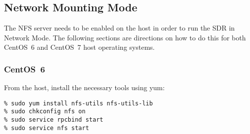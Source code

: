 \iffalse
This file is protected by Copyright. Please refer to the COPYRIGHT file
distributed with this source distribution.

This file is part of OpenCPI <http://www.opencpi.org>

OpenCPI is free software: you can redistribute it and/or modify it under the
terms of the GNU Lesser General Public License as published by the Free Software
Foundation, either version 3 of the License, or (at your option) any later
version.

OpenCPI is distributed in the hope that it will be useful, but WITHOUT ANY
WARRANTY; without even the implied warranty of MERCHANTABILITY or FITNESS FOR A
PARTICULAR PURPOSE. See the GNU Lesser General Public License for more details.

You should have received a copy of the GNU Lesser General Public License along
with this program. If not, see <http://www.gnu.org/licenses/>.
\fi

\newlength{\savedparindentnfs}%
\setlength{\savedparindentnfs}{\parindent}%
\setlength{\parindent}{0pt} %
\providecommand{\forceindent}{\leavevmode{\parindent=1em\indent}}%

\subsection{Network Mounting Mode}
\label{sec:network_mode}
The NFS server needs to be enabled on the host in order to run the SDR in Network Mode. The following sections are directions on how to do this for both CentOS~6 and CentOS~7 host operating systems.
\subsubsection{CentOS~6}
From the host, install the necessary tools using yum:
\begin{verbatim}
% sudo yum install nfs-utils nfs-utils-lib
% sudo chkconfig nfs on
% sudo service rpcbind start
% sudo service nfs start
\end{verbatim}

